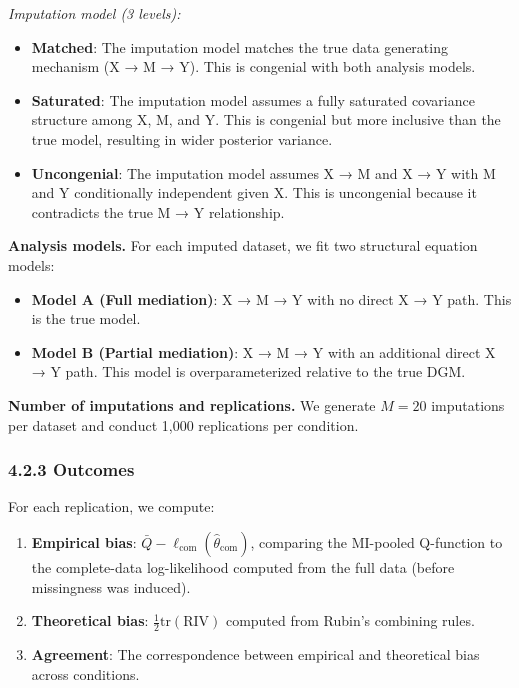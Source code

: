 \documentclass[
]{article}
\providecommand{\tightlist}{%
  \setlength{\itemsep}{0pt}\setlength{\parskip}{0pt}}
\begin{document}
\emph{Imputation model (3 levels):}

\begin{itemize}
\tightlist
\item
  \textbf{Matched}: The imputation model matches the true data
  generating mechanism (X → M → Y). This is congenial with both analysis
  models.
\item
  \textbf{Saturated}: The imputation model assumes a fully saturated
  covariance structure among X, M, and Y. This is congenial but more
  inclusive than the true model, resulting in wider posterior variance.
\item
  \textbf{Uncongenial}: The imputation model assumes X → M and X → Y
  with M and Y conditionally independent given X. This is uncongenial
  because it contradicts the true M → Y relationship.
\end{itemize}

\textbf{Analysis models.} For each imputed dataset, we fit two
structural equation models:

\begin{itemize}
\tightlist
\item
  \textbf{Model A (Full mediation)}: X → M → Y with no direct X → Y
  path. This is the true model.
\item
  \textbf{Model B (Partial mediation)}: X → M → Y with an additional
  direct X → Y path. This model is overparameterized relative to the
  true DGM.
\end{itemize}

\textbf{Number of imputations and replications.} We generate \(M = 20\)
imputations per dataset and conduct 1,000 replications per condition.

\subsubsection{4.2.3 Outcomes}\label{outcomes}

For each replication, we compute:

\begin{enumerate}
\def\labelenumi{\arabic{enumi}.}
\item
  \textbf{Empirical bias}:
  \(\bar{Q} - \ell_{\text{com}}(\hat{\theta}_{\text{com}})\), comparing
  the MI-pooled Q-function to the complete-data log-likelihood computed
  from the full data (before missingness was induced).
\item
  \textbf{Theoretical bias}: \(\frac{1}{2}\text{tr}(\text{RIV})\)
  computed from Rubin's combining rules.
\item
  \textbf{Agreement}: The correspondence between empirical and
  theoretical bias across conditions.
\end{enumerate}
\end{document}
